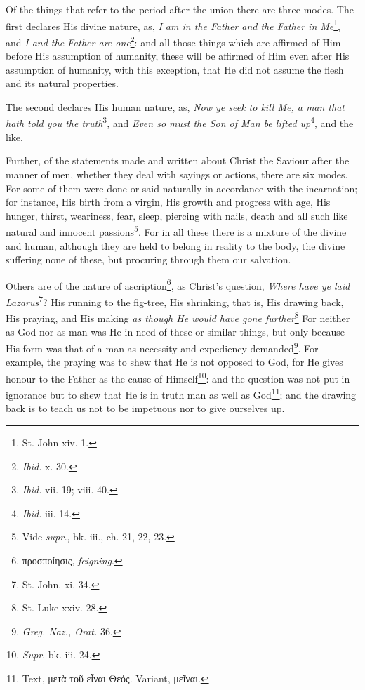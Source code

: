 Of the things that refer to the period after the union there are three modes. The first declares His divine nature, as, \emph{I am in the Father and the Father in Me}\footnote{St. John xiv. 1.}, and \emph{I and the Father are one}\footnote{\emph{Ibid. }x. 30.}: and all those things which are affirmed of Him before His assumption of humanity, these will be affirmed of Him even after His assumption of humanity, with this exception, that He did not assume the flesh and its natural properties.

The second declares His human nature, as, \emph{Now ye seek to kill Me, a man that hath told you the truth}\footnote{\emph{Ibid. }vii. 19; viii. 40.}, and \emph{Even so must the Son of Man be lifted up}\footnote{\emph{Ibid.} iii. 14.}, and the like.

Further, of the statements made and written about Christ the Saviour after the manner of men, whether they deal with sayings or actions, there are six modes. For some of them were done or said naturally in accordance with the incarnation; for instance, His birth from a virgin, His growth and progress with age, His hunger, thirst, weariness, fear, sleep, piercing with nails, death and all such like natural and innocent passions\footnote{Vide \emph{supr.}, bk. iii., ch. 21, 22, 23.}. For in all these there is a mixture of the divine and human, although they are held to belong in reality to the body, the divine suffering none of these, but procuring through them our salvation.

Others are of the nature of ascription\footnote{\textgreek{προσποίησις}, \emph{feigning}.}, as Christ’s question, \emph{Where have ye laid Lazarus}\footnote{St. John. xi. 34.}? His running to the fig-tree, His shrinking, that is, His drawing back, His praying, and His making \emph{as though He would have gone further}\footnote{St. Luke xxiv. 28.} For neither as God nor as man was He in need of these or similar things, but only because His form was that of a man as necessity and expediency demanded\footnote{\emph{Greg. Naz., Orat. }36.}. For example, the praying was to shew that He is not opposed to God, for He gives honour to the Father as the cause of Himself\footnote{\emph{Supr}. bk. iii. 24.}: and the question was not put in ignorance but to shew that He is in truth man as well as God\footnote{Text, \textgreek{μετὰ τοῦ εἶναι Θεός}. Variant, \textgreek{μεῖναι}.}; and the drawing back is to teach us not to be impetuous nor to give ourselves up.


